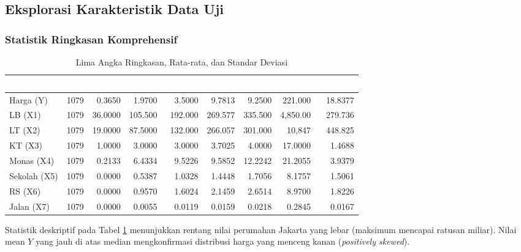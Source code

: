 \documentclass[12pt,a4paper]{article}
\begin{document}
\subsection{Eksplorasi Karakteristik Data Uji}

\subsubsection{Statistik Ringkasan Komprehensif}

\begin{table}[H]
\centering
\caption{Lima Angka Ringkasan, Rata-rata, dan Standar Deviasi}
\label{tab:summary1}
\small
\setlength{\tabcolsep}{5.5pt}
\begin{tabular}{lrrrrrrrr}
\toprule
\rowcolor{headerblue}
\textcolor{white}{\textbf{Var}} &
\textcolor{white}{\textbf{$n$}} &
\textcolor{white}{\textbf{Min}} &
\textcolor{white}{\textbf{$Q_1$}} &
\textcolor{white}{\textbf{Median}} &
\textcolor{white}{\textbf{Mean}} &
\textcolor{white}{\textbf{$Q_3$}} &
\textcolor{white}{\textbf{Max}} &
\textcolor{white}{\textbf{Std.Dev}} \\
\midrule
\rowcolor{rowlight}
Harga (Y) & 1079 & 0.3650 & 1.9700 & 3.5000 & 9.7813 & 9.2500 & 221.000 & 18.8377 \\
LB (X1) & 1079 & 36.0000 & 105.500 & 192.000 & 269.577 & 335.500 & 4,850.00 & 279.736 \\
\rowcolor{rowlight}
LT (X2) & 1079 & 19.0000 & 87.5000 & 132.000 & 266.057 & 301.000 & 10,847 & 448.825 \\
KT (X3) & 1079 & 1.0000 & 3.0000 & 3.0000 & 3.7025 & 4.0000 & 17.0000 & 1.4688 \\
\rowcolor{rowlight}
Monas (X4) & 1079 & 0.2133 & 6.4334 & 9.5226 & 9.5852 & 12.2242 & 21.2055 & 3.9379 \\
Sekolah (X5) & 1079 & 0.0000 & 0.5387 & 1.0328 & 1.4448 & 1.7056 & 8.1757 & 1.5061 \\
\rowcolor{rowlight}
RS (X6) & 1079 & 0.0000 & 0.9570 & 1.6024 & 2.1459 & 2.6514 & 8.9700 & 1.8226 \\
Jalan (X7) & 1079 & 0.0000 & 0.0055 & 0.0119 & 0.0159 & 0.0218 & 0.2845 & 0.0167 \\
\bottomrule
\end{tabular}
\end{table}

Statistik deskriptif pada Tabel \ref{tab:summary1} menunjukkan rentang nilai perumahan Jakarta yang lebar (maksimum mencapai ratusan miliar). Nilai mean $Y$ yang jauh di atas median mengkonfirmasi distribusi harga yang menceng kanan (\textit{positively skewed}).
\end{document}

